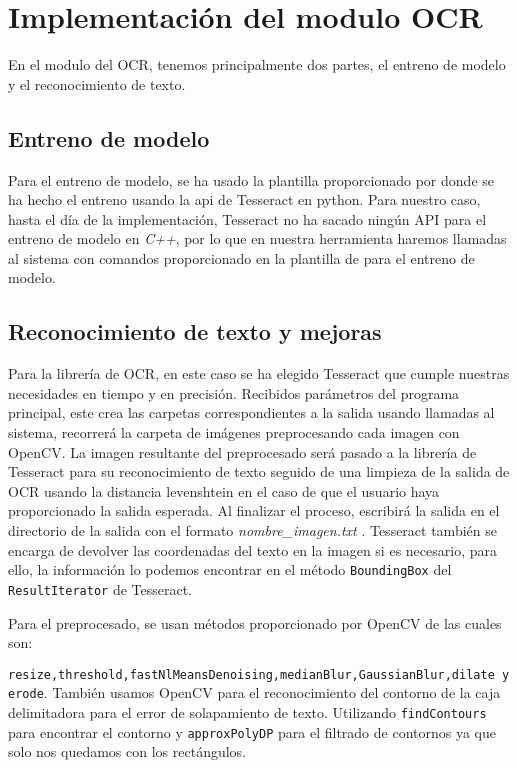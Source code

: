\section{Implementación del modulo OCR}
\label{sec:Implementación del OCR}
En el modulo del OCR, tenemos principalmente dos partes, el entreno de modelo y el reconocimiento de texto.
\subsection{Entreno de modelo}
Para el entreno de modelo, se ha usado la plantilla proporcionado por \cite{Joseda} donde se ha hecho el entreno usando la api de Tesseract en python. Para nuestro caso, hasta el día de la implementación, Tesseract no ha sacado ningún API para el entreno de modelo en \emph{C++}, por lo que en nuestra herramienta haremos llamadas al sistema con comandos proporcionado en la plantilla de \cite{Joseda} para el entreno de modelo.
\subsection{Reconocimiento de texto y mejoras}
Para la librería de OCR, en este caso se ha elegido Tesseract que cumple nuestras necesidades en tiempo y en precisión. Recibidos parámetros del programa principal, este crea las carpetas correspondientes a la salida usando llamadas al sistema, recorrerá la carpeta de imágenes preprocesando cada imagen con OpenCV. La imagen resultante del preprocesado será pasado a la librería de Tesseract para su reconocimiento de texto seguido de una limpieza de la salida de OCR usando la distancia levenshtein en el caso de que el usuario haya proporcionado la salida esperada. Al finalizar el proceso, escribirá la salida en el directorio de la salida con el formato \emph{nombre\_imagen.txt}   .
Tesseract también se encarga de devolver las coordenadas del texto en la imagen si es necesario, para ello, la información lo podemos encontrar en el método \texttt{BoundingBox} del \texttt{ResultIterator} de Tesseract.

Para el preprocesado, se usan métodos proporcionado por OpenCV de las cuales son:

 \texttt{resize,threshold,fastNlMeansDenoising,medianBlur,GaussianBlur,dilate y erode}.
También usamos OpenCV para el reconocimiento del contorno de la caja delimitadora para el error de solapamiento de texto. Utilizando \texttt{findContours} para encontrar el contorno y \texttt{approxPolyDP} para el filtrado de contornos ya que solo nos quedamos con los rectángulos. 
